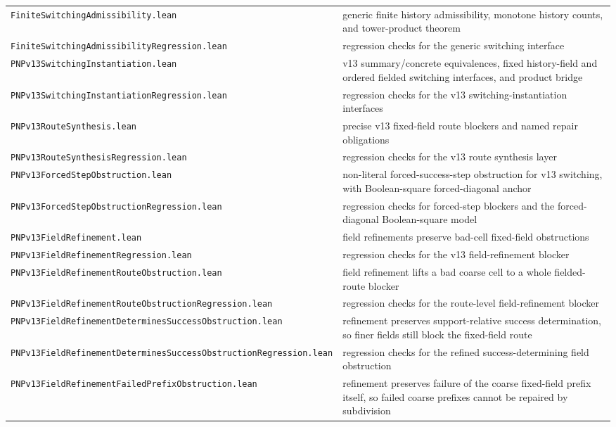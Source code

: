\documentclass[11pt]{article}
\theoremstyle{remark}
\begin{document}
\begin{center}
\begin{tabular}{ll}
\texttt{FiniteSwitchingAdmissibility.lean} & generic finite history admissibility, monotone history counts, and tower-product theorem \\
\texttt{FiniteSwitchingAdmissibilityRegression.lean} & regression checks for the generic switching interface \\
\texttt{PNPv13SwitchingInstantiation.lean} & v13 summary/concrete equivalences, fixed history-field and ordered fielded switching interfaces, and product bridge \\
\texttt{PNPv13SwitchingInstantiationRegression.lean} & regression checks for the v13 switching-instantiation interfaces \\
\texttt{PNPv13RouteSynthesis.lean} & precise v13 fixed-field route blockers and named repair obligations \\
\texttt{PNPv13RouteSynthesisRegression.lean} & regression checks for the v13 route synthesis layer \\
\texttt{PNPv13ForcedStepObstruction.lean} & non-literal forced-success-step obstruction for v13 switching, with Boolean-square forced-diagonal anchor \\
\texttt{PNPv13ForcedStepObstructionRegression.lean} & regression checks for forced-step blockers and the forced-diagonal Boolean-square model \\
\texttt{PNPv13FieldRefinement.lean} & field refinements preserve bad-cell fixed-field obstructions \\
\texttt{PNPv13FieldRefinementRegression.lean} & regression checks for the v13 field-refinement blocker \\
\texttt{PNPv13FieldRefinementRouteObstruction.lean} & field refinement lifts a bad coarse cell to a whole fielded-route blocker \\
\texttt{PNPv13FieldRefinementRouteObstructionRegression.lean} & regression checks for the route-level field-refinement blocker \\
\texttt{PNPv13FieldRefinementDeterminesSuccessObstruction.lean} & refinement preserves support-relative success determination, so finer fields still block the fixed-field route \\
\texttt{PNPv13FieldRefinementDeterminesSuccessObstructionRegression.lean} & regression checks for the refined success-determining field obstruction \\
\texttt{PNPv13FieldRefinementFailedPrefixObstruction.lean} & refinement preserves failure of the coarse fixed-field prefix itself, so failed coarse prefixes cannot be repaired by subdivision \\

\end{tabular}
\end{center}
\end{document}

